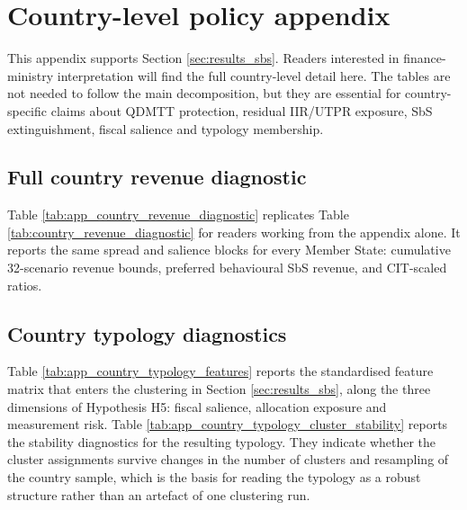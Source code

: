 \documentclass[11pt,a4paper]{article}
\begin{document}






\section{Country-level policy appendix}\label{app:country_policy}

This appendix supports Section \ref{sec:results_sbs}. Readers interested in finance-ministry interpretation will find the full country-level detail here. The tables are not needed to follow the main decomposition, but they are essential for country-specific claims about QDMTT protection, residual IIR/UTPR exposure, SbS extinguishment, fiscal salience and typology membership.

\subsection{Full country revenue diagnostic}\label{app:country_policy_matrix}

Table \ref{tab:app_country_revenue_diagnostic} replicates Table \ref{tab:country_revenue_diagnostic} for readers working from the appendix alone. It reports the same spread and salience blocks for every Member State: cumulative 32-scenario revenue bounds, preferred behavioural SbS revenue, and CIT-scaled ratios.



\subsection{Country typology diagnostics}\label{app:country_typology}

Table \ref{tab:app_country_typology_features} reports the standardised feature matrix that enters the clustering in Section \ref{sec:results_sbs}, along the three dimensions of Hypothesis H5: fiscal salience, allocation exposure and measurement risk. Table \ref{tab:app_country_typology_cluster_stability} reports the stability diagnostics for the resulting typology. They indicate whether the cluster assignments survive changes in the number of clusters and resampling of the country sample, which is the basis for reading the typology as a robust structure rather than an artefact of one clustering run.
\end{document}
